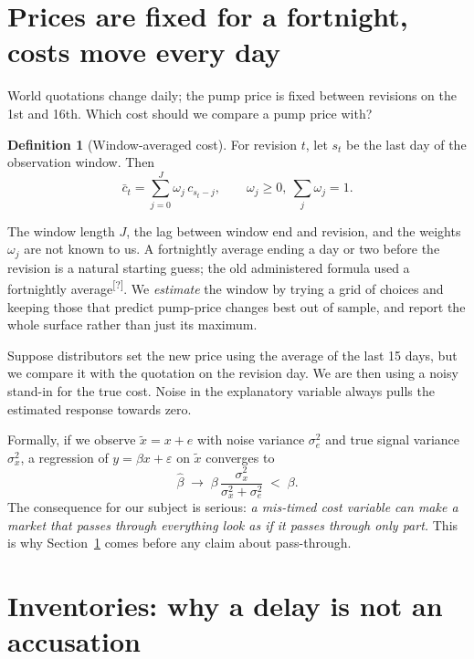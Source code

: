 \documentclass[11pt,a4paper]{article}
\newcommand{\tagQ}{\textsuperscript{\textcolor{red!70!black}{\textsf{\scriptsize[?]}}}}
\theoremstyle{definition}
\newtheorem{definition}{Definition}[section]
\begin{document}
\section{Prices are fixed for a fortnight, costs move every day}\label{sec:window}

World quotations change daily; the pump price is fixed between revisions on the 1st and 16th. Which cost should we compare a
pump price with?

\begin{definition}[Window-averaged cost]
For revision $t$, let $s_t$ be the last day of the observation window. Then
\begin{equation}
\bar c_t = \sum_{j=0}^{J} \omega_j\, c_{s_t - j},\qquad \omega_j\ge 0,\ \sum_j \omega_j = 1 .
\end{equation}
\end{definition}
The window length $J$, the lag between window end and revision, and the weights $\omega_j$ are not known to us. A fortnightly average
ending a day or two before the revision is a natural starting guess; the old administered formula used a fortnightly average\tagQ. We
\emph{estimate} the window by trying a grid of choices and keeping those that predict pump-price changes best out of sample, and report the
whole surface rather than just its maximum.

\begin{intuition}
Suppose distributors set the new price using the average of the last 15 days, but we compare it with the quotation on the revision day. We
are then using a noisy stand-in for the true cost. Noise in the explanatory variable always pulls the estimated response towards zero.
\end{intuition}

Formally, if we observe $\tilde x = x + e$ with noise variance $\sigma_e^2$ and true signal variance $\sigma_x^2$, a regression of $y=\beta x+\varepsilon$ on
$\tilde x$ converges to
\begin{equation}\label{eq:attenuation}
\hat\beta \;\to\; \beta\,\frac{\sigma_x^2}{\sigma_x^2+\sigma_e^2}\;<\;\beta .
\end{equation}
The consequence for our subject is serious: \emph{a mis-timed cost variable can make a market that passes through everything look as if
it passes through only part.} This is why Section~\ref{sec:window} comes before any claim about pass-through.

\section{Inventories: why a delay is not an accusation}\label{sec:inventory}
\end{document}
